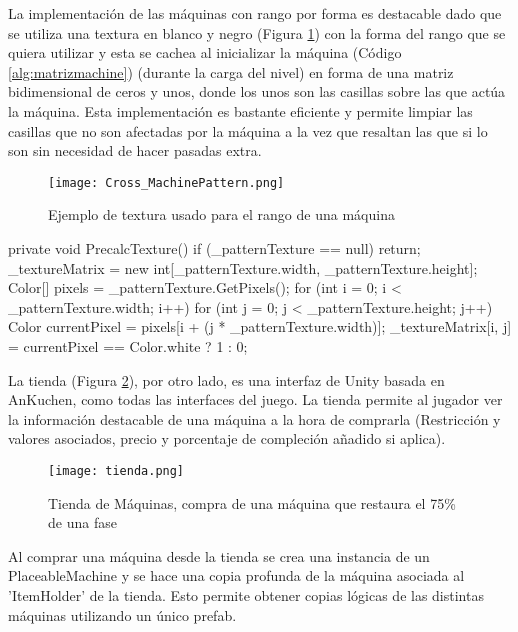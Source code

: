 La implementación de las máquinas con rango por forma es destacable dado que se utiliza una textura en blanco y negro (Figura \ref{fig:rango_pattern}) con la forma del rango que se quiera utilizar y esta se cachea al inicializar la máquina (Código \ref{alg:matrizmachine}) (durante la carga del nivel) en forma de una matriz bidimensional de ceros y unos, donde los unos son las casillas sobre las que actúa la máquina.
Esta implementación es bastante eficiente y permite limpiar las casillas que no son afectadas por la máquina a la vez que resaltan las que si lo son sin necesidad de hacer pasadas extra.

\begin{figure}[H]
    \centering
      \texttt{[image: Cross\_MachinePattern.png]}
    \caption{Ejemplo de textura usado para el rango de una máquina}
    \label{fig:rango_pattern}
  \end{figure}

\begin{mypython}[caption={Código para cachear la matríz del rango de una máquina.},label={alg:matrizmachine}]
private void PrecalcTexture() 
{
    if (_patternTexture == null) return;
    _textureMatrix = new int[_patternTexture.width, _patternTexture.height];
    Color[] pixels = _patternTexture.GetPixels();
    for (int i = 0; i < _patternTexture.width; i++) 
    {
        for (int j = 0; j < _patternTexture.height; j++) 
        {
            Color currentPixel = pixels[i + (j * _patternTexture.width)];
            _textureMatrix[i, j] = currentPixel == Color.white ? 1 : 0;
        }
    }
}
\end{mypython}

La tienda (Figura \ref{fig:tienda}), por otro lado, es una interfaz de Unity basada en AnKuchen\cite{AnKuchen}, como todas las interfaces del juego. La tienda permite al jugador ver la información destacable de una máquina a la hora de comprarla (Restricción y valores asociados, precio y porcentaje de compleción añadido si aplica). 

\begin{figure}[H]
\centering
    \texttt{[image: tienda.png]}
\caption{Tienda de Máquinas, compra de una máquina que restaura el 75\% de una fase}
\label{fig:tienda}
\end{figure}

Al comprar una máquina desde la tienda se crea una instancia de un PlaceableMachine y se hace una copia profunda de la máquina asociada al 'ItemHolder' de la tienda. Esto permite obtener copias lógicas de las distintas máquinas utilizando un único prefab.


